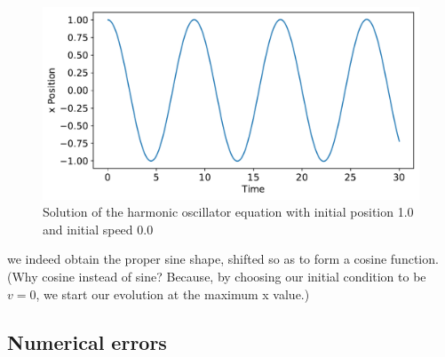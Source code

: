 \documentclass[twocolumn,apj]{openjournal}
\begin{document}
\begin{figure}[htbp]
\begin{center}
\includegraphics[width=\linewidth]{oscillator-euler.pdf}
\caption{Solution of the harmonic oscillator equation with initial position 1.0 and initial speed 0.0}
\label{HOPlot1}
\end{center}
\end{figure}
we indeed obtain the proper sine shape, shifted so as to form a cosine function. (Why cosine instead of sine? Because, by choosing our initial condition to be $v=0$, we start our evolution at the maximum x value.) 

\subsection{Numerical errors}
\label{NumericalErrors}
\end{document}
